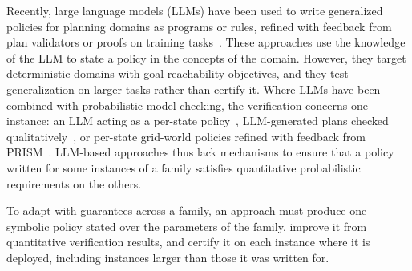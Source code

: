 Recently, large language models (LLMs) have been used to write generalized policies for planning domains as programs or rules, refined with feedback from plan validators or proofs on training tasks~\cite{TODO-Silver-generalized-planning-LLMs,TODO-Stein-strategy-refinement,TODO-Prompt-Prove-Patch,TODO-GenePlan}.
These approaches use the knowledge of the LLM to state a policy in the concepts of the domain.
However, they target deterministic domains with goal-reachability objectives, and they test generalization on larger tasks rather than certify it.
Where LLMs have been combined with probabilistic model checking, the verification concerns one instance: an LLM acting as a per-state policy~\cite{TODO-Gross-verifying-memoryless-LLM-decisions}, LLM-generated plans checked qualitatively~\cite{TODO-VeriPlan}, or per-state grid-world policies refined with feedback from PRISM~\cite{TODO-LLM-gridworld-PMC-FSE-Companion-2026}.
LLM-based approaches thus lack mechanisms to ensure that a policy written for some instances of a family satisfies quantitative probabilistic requirements on the others.

To adapt with guarantees across a family, an approach must produce one symbolic policy stated over the parameters of the family, improve it from quantitative verification results, and certify it on each instance where it is deployed, including instances larger than those it was written for.

